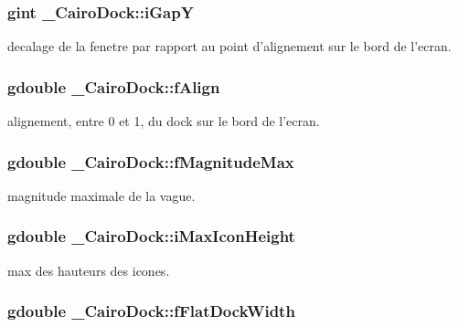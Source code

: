 \subsubsection{\setlength{\rightskip}{0pt plus 5cm}gint {\bf \_\-CairoDock::iGapY}}\label{struct__CairoDock_744083c6364282178069eae84f63f4e2}


decalage de la fenetre par rapport au point d'alignement sur le bord de l'ecran. 

\subsubsection{\setlength{\rightskip}{0pt plus 5cm}gdouble {\bf \_\-CairoDock::fAlign}}\label{struct__CairoDock_b57e22909edfc5389d77da68d687c429}


alignement, entre 0 et 1, du dock sur le bord de l'ecran. 

\subsubsection{\setlength{\rightskip}{0pt plus 5cm}gdouble {\bf \_\-CairoDock::fMagnitudeMax}}\label{struct__CairoDock_15a4a04476f5c0cbb7c5592f93b581a3}


magnitude maximale de la vague. 

\subsubsection{\setlength{\rightskip}{0pt plus 5cm}gdouble {\bf \_\-CairoDock::iMaxIconHeight}}\label{struct__CairoDock_1156cb6f7527bf096bf3b5d1c0c95247}


max des hauteurs des icones. 

\subsubsection{\setlength{\rightskip}{0pt plus 5cm}gdouble {\bf \_\-CairoDock::fFlatDockWidth}}\label{struct__CairoDock_282cfef8327f25289fddf4f51dfa4ed2}


